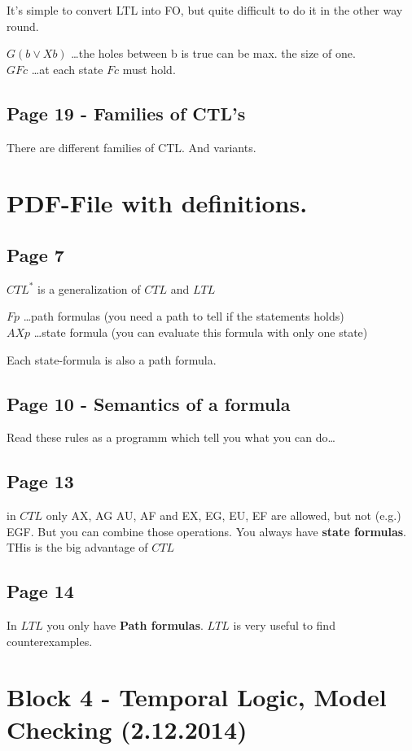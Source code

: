 \documentclass[a4paper]{article}
\begin{document}
It's simple to convert LTL into FO, but quite difficult to do it in the other
way round.

$G(b \vee Xb)$ \ldots the holes between b is true can be max. the size of one.\\
$GFc$ \ldots at each state $Fc$ must hold.


\subsection{Page 19 - Families of CTL's}
There are different families of CTL. And variants.

\section{PDF-File with definitions.}
\subsection{Page 7}

$CTL^*$ is a generalization of $CTL$ and $LTL$

$Fp$ \ldots path formulas (you need a path to tell if the statements holds)\\
$AXp$ \ldots state formula (you can evaluate this formula with only one state)

Each state-formula is also a path formula.

\subsection{Page 10 - Semantics of a formula}

Read these rules as a programm which tell you what you can do\ldots

\subsection{Page 13}
in $CTL$ only AX, AG AU, AF and EX, EG, EU, EF are allowed, but not (e.g.) EGF.
But you can combine those operations. You always have \textbf{state formulas}.
THis is the big advantage of $CTL$


\subsection{Page 14}

In $LTL$ you only have \textbf{Path formulas}. $LTL$ is very useful to find
counterexamples.

 
\section{Block 4 - Temporal Logic, Model Checking (2.12.2014)}
\end{document}
